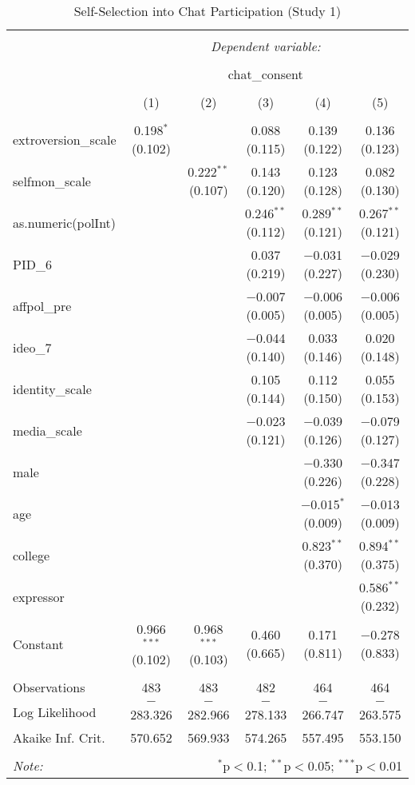 
\begin{table}[H] \centering 
  \caption{Self-Selection into Chat Participation (Study 1)} 
  \label{tab:s1_selection_into_chat} 
\begin{tabular}{@{\extracolsep{5pt}}lccccc} 
\\[-1.8ex]\hline 
\hline \\[-1.8ex] 
 & \multicolumn{5}{c}{\textit{Dependent variable:}} \\ 
\cline{2-6} 
\\[-1.8ex] & \multicolumn{5}{c}{chat\_consent} \\ 
\\[-1.8ex] & (1) & (2) & (3) & (4) & (5)\\ 
\hline \\[-1.8ex] 
 extroversion\_scale & 0.198$^{*}$ (0.102) &  & 0.088 (0.115) & 0.139 (0.122) & 0.136 (0.123) \\ 
  selfmon\_scale &  & 0.222$^{**}$ (0.107) & 0.143 (0.120) & 0.123 (0.128) & 0.082 (0.130) \\ 
  as.numeric(polInt) &  &  & 0.246$^{**}$ (0.112) & 0.289$^{**}$ (0.121) & 0.267$^{**}$ (0.121) \\ 
  PID\_6 &  &  & 0.037 (0.219) & $-$0.031 (0.227) & $-$0.029 (0.230) \\ 
  affpol\_pre &  &  & $-$0.007 (0.005) & $-$0.006 (0.005) & $-$0.006 (0.005) \\ 
  ideo\_7 &  &  & $-$0.044 (0.140) & 0.033 (0.146) & 0.020 (0.148) \\ 
  identity\_scale &  &  & 0.105 (0.144) & 0.112 (0.150) & 0.055 (0.153) \\ 
  media\_scale &  &  & $-$0.023 (0.121) & $-$0.039 (0.126) & $-$0.079 (0.127) \\ 
  male &  &  &  & $-$0.330 (0.226) & $-$0.347 (0.228) \\ 
  age &  &  &  & $-$0.015$^{*}$ (0.009) & $-$0.013 (0.009) \\ 
  college &  &  &  & 0.823$^{**}$ (0.370) & 0.894$^{**}$ (0.375) \\ 
  expressor &  &  &  &  & 0.586$^{**}$ (0.232) \\ 
  Constant & 0.966$^{***}$ (0.102) & 0.968$^{***}$ (0.103) & 0.460 (0.665) & 0.171 (0.811) & $-$0.278 (0.833) \\ 
 \hline \\[-1.8ex] 
Observations & 483 & 483 & 482 & 464 & 464 \\ 
Log Likelihood & $-$283.326 & $-$282.966 & $-$278.133 & $-$266.747 & $-$263.575 \\ 
Akaike Inf. Crit. & 570.652 & 569.933 & 574.265 & 557.495 & 553.150 \\ 
\hline 
\hline \\[-1.8ex] 
\textit{Note:}  & \multicolumn{5}{r}{$^{*}$p$<$0.1; $^{**}$p$<$0.05; $^{***}$p$<$0.01} \\ 
\end{tabular} 
\end{table} 

